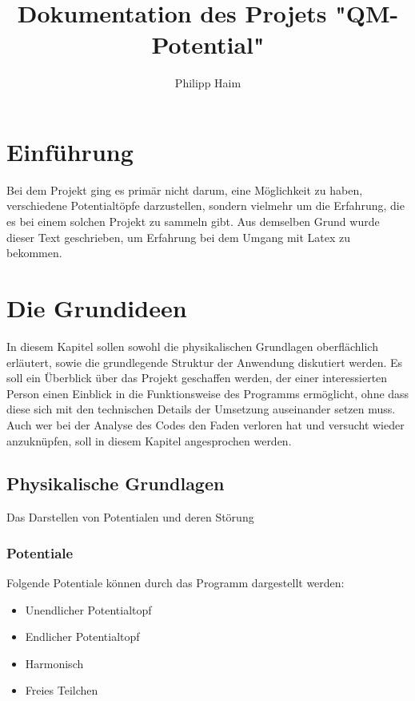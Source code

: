 \documentclass[12pt,twoside,a4paper]{book}
\begin{document}
\frontmatter

\title{Dokumentation des Projets "QM-Potential"}
\author{Philipp Haim}
\maketitle

\chapter{Einf\"{u}hrung}
Bei dem Projekt ging es primär nicht darum, eine M\"{o}glichkeit zu haben, verschiedene Potentialt\"{o}pfe
darzustellen, sondern vielmehr um die Erfahrung, die es bei einem solchen Projekt zu sammeln gibt.
Aus demselben Grund wurde dieser Text geschrieben, um Erfahrung bei dem Umgang mit Latex zu bekommen.


\mainmatter
\chapter{Die Grundideen}
In diesem Kapitel sollen sowohl die physikalischen Grundlagen oberfl\"{a}chlich erl\"{a}utert, sowie die grundlegende Struktur der Anwendung diskutiert werden. Es soll ein \"{U}berblick \"{u}ber das Projekt geschaffen werden, der einer interessierten Person einen Einblick in die Funktionsweise des Programms ermöglicht, ohne dass diese sich mit den technischen Details der Umsetzung auseinander setzen muss.\\ Auch wer bei der Analyse des Codes den Faden verloren hat und versucht wieder anzukn\"{u}pfen, soll in diesem Kapitel angesprochen werden.

\section{Physikalische Grundlagen}
Das Darstellen von Potentialen und deren St\"{o}rung
\subsection{Potentiale} \label{sec:potential}
Folgende Potentiale k\"{o}nnen durch das Programm dargestellt werden:

\begin{itemize}
\item Unendlicher Potentialtopf
\item Endlicher Potentialtopf
\item Harmonisch
\item Freies Teilchen
\end{itemize}
\end{document}
